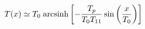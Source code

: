 \begin{equation}
T(x) \simeq 
T_{0}\;{\rm arcsinh}\left[-\frac{T_{p}}{T_{0}T_{11}}\sin \left(
\frac{x}{T_{0}}\right)\right]
\end{equation}


